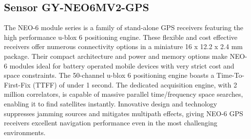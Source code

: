\subsection{Sensor GY-NEO6MV2-GPS}
The NEO-6 module series is a family of stand-alone GPS receivers featuring the high performance u-blox 6
positioning engine. These flexible and cost effective receivers offer numerous connectivity options in a miniature
16 x 12.2 x 2.4 mm package. Their compact architecture and power and memory options make NEO-6 modules
ideal for battery operated mobile devices with very strict cost and space constraints.
The 50-channel u-blox 6 positioning engine boasts a Time-To-First-Fix (TTFF) of under 1 second. The dedicated
acquisition engine, with 2 million correlators, is capable of massive parallel time/frequency space searches,
enabling it to find satellites instantly. Innovative design and technology suppresses jamming sources and
mitigates multipath effects, giving NEO-6 GPS receivers excellent navigation performance even in the most
challenging environments.

